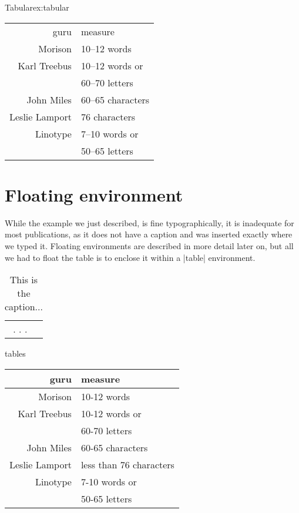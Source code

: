 \begin{texexample}{Tabular}{ex:tabular}
\begin{tabular}{rl}
\toprule
guru 			& measure \\
Morison      & 10--12 words \\
Karl Treebus & 10--12 words or\\
             & 60--70 letters \\
John Miles   & 60--65 characters \\
Leslie Lamport & 76 characters \\
Linotype       & 7--10 words or\\
& 50--65 letters\\
\bottomrule
\end{tabular} 
\end{texexample}


\section{Floating environment} 

While the example we just described, is fine typographically, it is inadequate for most publications, as it does not have a caption and was inserted exactly where we typed it. Floating environments are described in more detail later on, but all we had to float the table is to enclose it within a |table| environment.

\begin{teXXX}
\begin{table}[htp]
\begin{tabular}{rl}
.
.
.
\end{tabular}
\caption{This is the caption...}
\end{table}
\end{teXXX}

\begin{texexample}{tables}{}
\centering
\begin{tabular}{rl}
\toprule
  guru                  & measure \\
\midrule
  Morison             & 10-12 words \\
  Karl Treebus      & 10-12 words or\\
                          & 60-70 letters \\
  John Miles         & 60-65 characters \\
  Leslie Lamport   & less than 76 characters \\
  Linotype            & 7-10 words or\\
                         & 50-65 letters\\
\bottomrule
\end{tabular}
\end{texexample}



